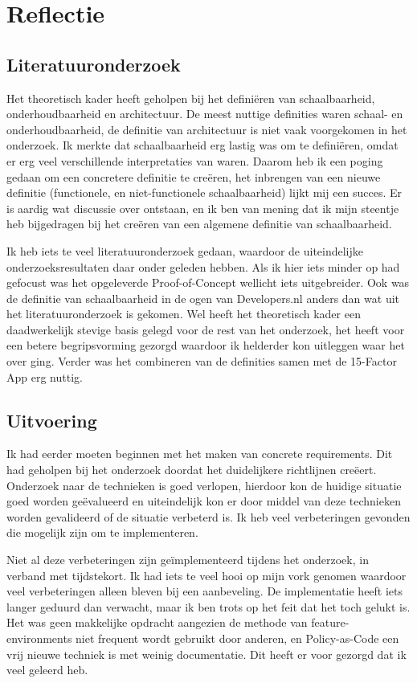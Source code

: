 \chapter{Reflectie}

\label{Reflectie}

\section{Literatuuronderzoek}
Het theoretisch kader heeft geholpen bij het definiëren van schaalbaarheid, onderhoudbaarheid en architectuur. De meest nuttige definities waren schaal- en onderhoudbaarheid, de definitie van architectuur is niet vaak voorgekomen in het onderzoek. Ik merkte dat schaalbaarheid erg lastig was om te definiëren, omdat er erg veel verschillende interpretaties van waren. Daarom heb ik een poging gedaan om een concretere definitie te creëren, het inbrengen van een nieuwe definitie (functionele, en niet-functionele schaalbaarheid) lijkt mij een succes. Er is aardig wat discussie over ontstaan, en ik ben van mening dat ik mijn steentje heb bijgedragen bij het creëren van een algemene definitie van schaalbaarheid.

Ik heb iets te veel literatuuronderzoek gedaan, waardoor de uiteindelijke onderzoeksresultaten daar onder geleden hebben. Als ik hier iets minder op had gefocust was het opgeleverde Proof-of-Concept wellicht iets uitgebreider. Ook was de definitie van schaalbaarheid in de ogen van Developers.nl anders dan wat uit het literatuuronderzoek is gekomen. Wel heeft het theoretisch kader een daadwerkelijk stevige basis gelegd voor de rest van het onderzoek, het heeft voor een betere begripsvorming gezorgd waardoor ik helderder kon uitleggen waar het over ging. Verder was het combineren van de definities samen met de 15-Factor App erg nuttig.

\section{Uitvoering}
Ik had eerder moeten beginnen met het maken van concrete requirements. Dit had geholpen bij het onderzoek doordat het duidelijkere richtlijnen creëert. Onderzoek naar de technieken is goed verlopen, hierdoor kon de huidige situatie goed worden geëvalueerd en uiteindelijk kon er door middel van deze technieken worden gevalideerd of de situatie verbeterd is. Ik heb veel verbeteringen gevonden die mogelijk zijn om te implementeren. 

Niet al deze verbeteringen zijn geïmplementeerd tijdens het onderzoek, in verband met tijdstekort. Ik had iets te veel hooi op mijn vork genomen waardoor veel verbeteringen alleen bleven bij een aanbeveling. De implementatie heeft iets langer geduurd dan verwacht, maar ik ben trots op het feit dat het toch gelukt is. Het was geen makkelijke opdracht aangezien de methode van feature-environments niet frequent wordt gebruikt door anderen, en Policy-as-Code een vrij nieuwe techniek is met weinig documentatie. Dit heeft er voor gezorgd dat ik veel geleerd heb.

